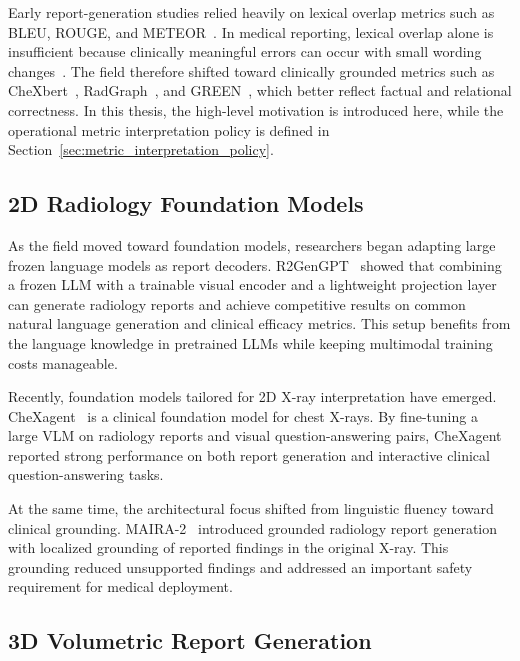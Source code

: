 Early report-generation studies relied heavily on lexical overlap metrics such as BLEU, ROUGE, and METEOR~\cite{jing2018automatic,chen2020generating,chen2022crossmodal,wang2025rrgsurvey}. In medical reporting, lexical overlap alone is insufficient because clinically meaningful errors can occur with small wording changes~\cite{wang2025rrgsurvey,ostmeier2024green}. The field therefore shifted toward clinically grounded metrics such as \ac{CheXbert}~\cite{smit2020chexbert}, \ac{RadGraph}~\cite{jain2021radgraph}, and \ac{GREEN}~\cite{ostmeier2024green}, which better reflect factual and relational correctness. In this thesis, the high-level motivation is introduced here, while the operational metric interpretation policy is defined in Section~\ref{sec:metric_interpretation_policy}.

\subsection{2D Radiology Foundation Models}

As the field moved toward foundation models, researchers began adapting large frozen language models as report decoders. R2GenGPT~\cite{wang2023r2gengpt} showed that combining a frozen LLM with a trainable visual encoder and a lightweight projection layer can generate radiology reports and achieve competitive results on common natural language generation and clinical efficacy metrics. This setup benefits from the language knowledge in pretrained LLMs while keeping multimodal training costs manageable.

Recently, foundation models tailored for 2D X-ray interpretation have emerged. CheXagent~\cite{chen2024chexagent} is a clinical foundation model for chest X-rays. By fine-tuning a large VLM on radiology reports and visual question-answering pairs, CheXagent reported strong performance on both report generation and interactive clinical question-answering tasks. 

At the same time, the architectural focus shifted from linguistic fluency toward clinical grounding. MAIRA-2~\cite{bannur2024maira} introduced grounded radiology report generation with localized grounding of reported findings in the original X-ray. This grounding reduced unsupported findings and addressed an important safety requirement for medical deployment. 

\subsection{3D Volumetric Report Generation}

